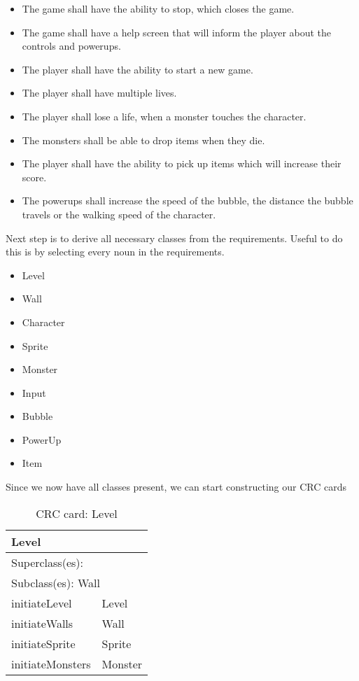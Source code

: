 \begin{itemize}
	 \item The game shall have the ability to stop, which closes the game.
	 \item The game shall have a help screen that will inform the player about the controls and powerups.
	 \item The player shall have the ability to start a new game.
	 \item The player shall have multiple lives.
	 \item The player shall lose a life, when a monster touches the character. 
	 \item The monsters shall be able to drop items when they die.
	 \item The player shall have the ability to pick up items which will increase their score.
	 \item The powerups shall increase the speed of the bubble, the distance the bubble travels or the walking speed of the character.
\end{itemize}

Next step is to derive all necessary classes from the requirements. Useful to do this is by selecting every noun in the requirements. 
\begin{itemize}
    \item Level
    \item Wall
    \item Character
    \item Sprite
    \item Monster
    \item Input
    \item Bubble
    \item PowerUp
    \item Item
\end{itemize}

Since we now have all classes present, we can start constructing our CRC cards

\begin{table}[]
\centering
\label{crc_level}
\begin{tabular}{|l|l|}
\hline

\multicolumn{2}{|l|}{Level} \\ \hline
\multicolumn{2}{|l|}{Superclass(es):} \\ \hline
\multicolumn{2}{|l|}{Subclass(es): Wall} \\ \hline
initiateLevel           & Level \\ \hline
initiateWalls           & Wall \\ \hline
initiateSprite          & Sprite \\ \hline
initiateMonsters        & Monster \\ \hline
\end{tabular}
\caption{CRC card: Level}
\end{table}


